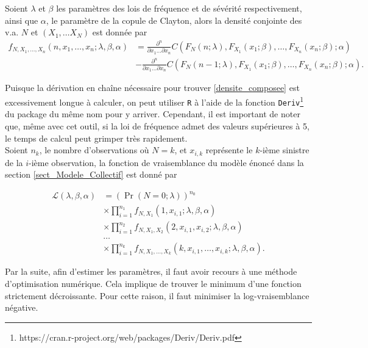 \documentclass{article}
\begin{document}
		Soient $\lambda$ et $\beta$ les paramètres des lois de fréquence et de sévérité respectivement, ainsi que $\alpha$, le paramètre de la copule de Clayton, alors la densité conjointe des v.a. $N$ et $(X_1, \dots X_N)$ est donnée par
		\begin{align}
		f_{N, X_1, \dots, X_n}(n, x_1, \dots, x_n; \lambda, \beta, \alpha) 
		&= \frac{\partial^n}{\partial x_1 \dots \partial x_n} C(F_N(n;\lambda),F_{X_1}(x_1; \beta),\dots,F_{X_n}(x_n;\beta);\alpha)  \nonumber \\
		&   - \frac{\partial^n}{\partial x_1 \dots \partial x_n} C(F_N(n-1;\lambda),F_{X_1}(x_1;\beta),\dots,F_{X_n}(x_n;\beta);\alpha). \label{densite_composee}
		\end{align}
		
		Puisque la dérivation en chaîne nécessaire pour trouver \eqref{densite_composee} est excessivement longue à calculer, on peut utiliser \texttt{R} à l'aide de la fonction \texttt{Deriv}\footnote{https://cran.r-project.org/web/packages/Deriv/Deriv.pdf} du package du même nom pour y arriver. Cependant, il est important de noter que, même avec cet outil, si la loi de fréquence admet des valeurs supérieures à 5, le temps de calcul peut grimper très rapidement.\\
		
		Soient $n_k$, le nombre d'observations où $N = k$, et $x_{i,k}$ représente le $k$-ième sinistre de la $i$-ième observation,
		la fonction de vraisemblance du modèle énoncé dans la section \ref{sect_Modele_Collectif} est donné par
		
		\begin{align*}
		 \mathcal{L}(\lambda, \beta, \alpha) 
		 &= \left( \Pr (N=0 ; \lambda)\right)^{n_0} \\
		 & \times \prod_{i = 1}^{n_1} f_{N,X_1}(1,x_{i,1};\lambda,\beta, \alpha)\\
		 & \times \prod_{i = 1}^{n_2} f_{N,X_1,X_2}(2,x_{i,1},x_{i,2};\lambda,\beta, \alpha)\\
		 & \dots\\
		 & \times \prod_{i = 1}^{n_k} f_{N,X_1,\dots,X_k}(k,x_{i,1},\dots,x_{i,k};\lambda,\beta, \alpha).
		\end{align*}
		
		Par la suite, afin d'estimer les paramètres, il faut avoir recours à une méthode d'optimisation numérique. Cela implique de trouver le minimum d'une fonction strictement décroissante. Pour cette raison, il faut minimiser la log-vraisemblance négative.\\
		
\end{document}
